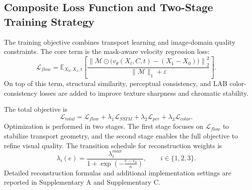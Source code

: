 \subsection{Composite Loss Function and Two-Stage Training Strategy}
The training objective combines transport learning and image-domain quality constraints. The core term is the mask-aware velocity regression loss:
\begin{equation}
\mathcal{L}_{flow} = \mathbb{E}_{X_0,X_1,t}\left[\frac{\left\|\mathcal{M}\odot\bigl(v_{\theta}(X_t,C,t)-(X_1-X_0)\bigr)\right\|_2^2}{\|\mathcal{M}\|_1+\varepsilon}\right].
\label{eq:lflow_masked}
\end{equation}
On top of this term, structural similarity, perceptual consistency, and LAB color-consistency losses are added to improve texture sharpness and chromatic stability.

The total objective is
\begin{equation}
\mathcal{L}_{total} = \mathcal{L}_{flow} + \lambda_1\mathcal{L}_{SSIM} + \lambda_2\mathcal{L}_{per} + \lambda_3\mathcal{L}_{color}.
\label{eq:ltotal}
\end{equation}
Optimization is performed in two stages. The first stage focuses on $\mathcal{L}_{flow}$ to stabilize transport geometry, and the second stage enables the full objective to refine visual quality. The transition schedule for reconstruction weights is
\begin{equation}
\lambda_i(e) = \frac{\lambda_i^{max}}{1 + \exp\left(-\frac{e - e_0}{\kappa}\right)},\qquad i\in\{1,2,3\}.
\label{eq:lambda_schedule}
\end{equation}
Detailed reconstruction formulas and additional implementation settings are reported in Supplementary A and Supplementary C.
